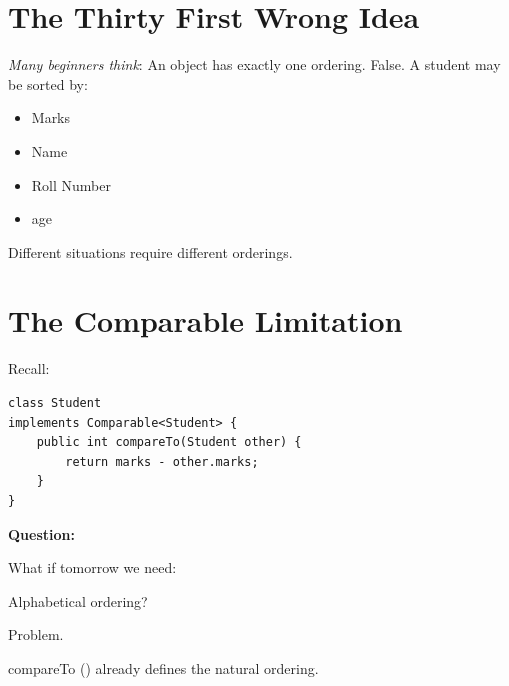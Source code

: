 \documentclass[11pt,a4paper]{book}
\begin{document}
\section{The Thirty First Wrong Idea}

\begin{trap}

\emph{Many beginners think}: An object has exactly one ordering.
\textcolor{RosettaOrange}{False}.
A student may be sorted by:
\begin{itemize}
\item Marks
\item Name
\item Roll Number
\item age
\end{itemize}
Different situations require
different orderings.

\end{trap}


\section{The Comparable Limitation}

Recall:

\begin{verbatim} 
class Student
implements Comparable<Student> {
    public int compareTo(Student other) {
        return marks - other.marks;
    }
}
\end{verbatim}


\textbf{Question:}

What if tomorrow we need:


Alphabetical ordering?


Problem.


compareTo () already defines
the natural ordering.

\end{document}
